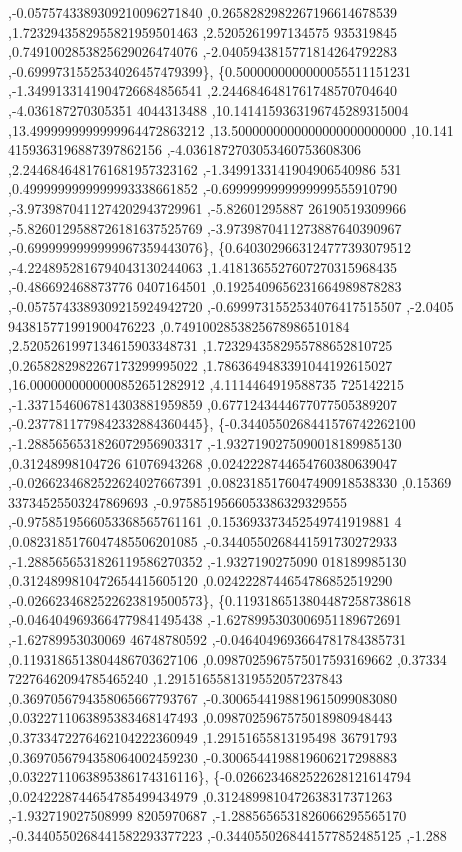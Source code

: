 \begin{DoxyCode}
       ,-0.0575743389309210096271840 ,0.2658282982267196614678539 ,1.7232943582955821959501463 ,2.5205261997134575
      935319845 ,0.7491002853825629026474076 ,-2.0405943815771814264792283 ,-0.6999731552534026457479399\},
\{0.5000000000000055511151231 ,-1.3499133141904726684856541 ,2.2446846481761748570704640 ,-4.036187270305351
      4044313488 ,10.1414159363196745289315004 ,13.4999999999999964472863212 ,13.5000000000000000000000000 ,10.141
      4159363196887397862156 ,-4.0361872703053460753608306 ,2.2446846481761681957323162 ,-1.3499133141904906540986
      531 ,0.4999999999999993338661852 ,-0.6999999999999999555910790 ,-3.9739870411274202943729961 ,-5.82601295887
      26190519309966 ,-5.8260129588726181637525769 ,-3.9739870411273887640390967 ,-0.6999999999999967359443076\},
\{0.6403029663124777393079512 ,-4.2248952816794043130244063 ,1.4181365527607270315968435 ,-0.486692468873776
      0407164501 ,0.1925409656231664989878283 ,-0.0575743389309215924942720 ,-0.6999731552534076417515507 ,-2.0405
      943815771991900476223 ,0.7491002853825678986510184 ,2.5205261997134615903348731 ,1.7232943582955788652810725
       ,0.2658282982267173299995022 ,1.7863649483391044192615027 ,16.0000000000000852651282912 ,4.1114464919588735
      725142215 ,-1.3371546067814303881959859 ,0.6771243444677077505389207 ,-0.2377811779842332884360445\},
\{-0.3440550268441576742262100 ,-1.2885656531826072956903317 ,-1.9327190275090018189985130 ,0.31248998104726
      61076943268 ,0.0242228744654760380639047 ,-0.0266234682522624027667391 ,0.0823185176047490918538330 ,0.15369
      33734525503247869693 ,-0.9758519566053386329329555 ,-0.9758519566053368565761161 ,0.153693373452549741919881
      4 ,0.0823185176047485506201085 ,-0.3440550268441591730272933 ,-1.2885656531826119586270352 ,-1.9327190275090
      018189985130 ,0.3124899810472654415605120 ,0.0242228744654786852519290 ,-0.0266234682522623819500573\},
\{0.1193186513804487258738618 ,-0.0464049693664779841495438 ,-1.6278995303006951189672691 ,-1.62789953030069
      46748780592 ,-0.0464049693664781784385731 ,0.1193186513804486703627106 ,0.0987025967575017593169662 ,0.37334
      72276462094785465240 ,1.2915165581319552057237843 ,0.3697056794358065667793767 ,-0.3006544198819615099083080
       ,0.0322711063895383468147493 ,0.0987025967575018980948443 ,0.3733472276462104222360949 ,1.29151655813195498
      36791793 ,0.3697056794358064002459230 ,-0.3006544198819606217298883 ,0.0322711063895386174316116\},
\{-0.0266234682522628121614794 ,0.0242228744654785499434979 ,0.3124899810472638317371263 ,-1.932719027508999
      8205970687 ,-1.2885656531826066295565170 ,-0.3440550268441582293377223 ,-0.3440550268441577852485125 ,-1.288

\end{DoxyCode}
